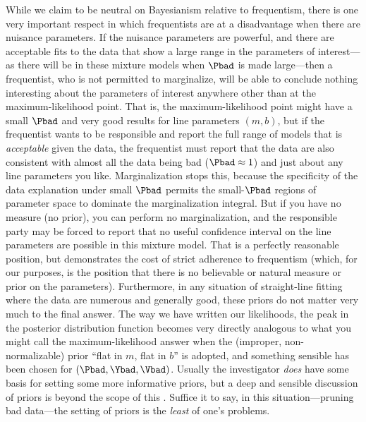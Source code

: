 \documentclass[12pt,twoside,pdftex]{article}
\begin{document}
{  While we claim to be neutral on Bayesianism relative to frequentism,
  there is one very important respect in which frequentists are at a
  disadvantage when there are nuisance parameters.  If the nuisance
  parameters are powerful, and there are acceptable fits to the data
  that show a large range in the parameters of interest---as there
  will be in these mixture models when $\Pbad$ is made large---then a
  frequentist, who is not permitted to marginalize, will be able to
  conclude nothing interesting about the parameters of interest
  anywhere other than at the maximum-likelihood point.  That is, the
  maximum-likelihood point might have a small $\Pbad$ and very good
  results for line parameters $(m,b)$, but if the frequentist wants to
  be responsible and report the full range of models that is
  \emph{acceptable} given the data, the frequentist must report that
  the data are also consistent with almost all the data being bad
  ($\Pbad\approx 1$) and just about any line parameters you like.
  Marginalization stops this, because the specificity of the data
  explanation under small $\Pbad$ permits the small-$\Pbad$ regions of
  parameter space to dominate the marginalization integral.  But if
  you have no measure (no prior), you can perform no marginalization,
  and the responsible party may be forced to report that no useful
  confidence interval on the line parameters are possible in this
  mixture model.  That is a perfectly reasonable position, but
  demonstrates the cost of strict adherence to frequentism (which, for
  our purposes, is the position that there is no believable or natural
  measure or prior on the parameters).}  Furthermore, in any situation
of straight-line fitting where the data are numerous and generally
good, these priors do not matter very much to the final answer.  The
way we have written our likelihoods, the peak in the posterior
distribution function becomes very directly analogous to what you
might call the maximum-likelihood answer when the (improper,
non-normalizable) prior ``flat in $m$, flat in $b$'' is adopted, and
something sensible has been chosen for $(\Pbad,\Ybad,\Vbad)$.  Usually
the investigator \emph{does} have some basis for setting some more
informative priors, but a deep and sensible discussion of priors is
beyond the scope of this \documentname.  Suffice it to say, in this
situation---pruning bad data---the setting of priors is the
\emph{least} of one's problems.
\end{document}
